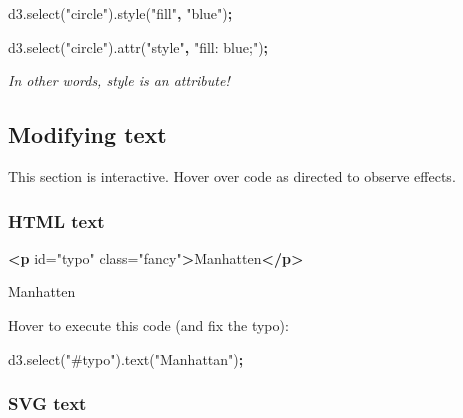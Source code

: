 \documentclass[openany]{book}
\newenvironment{Shaded}{\begin{snugshade}}{\end{snugshade}}
\newcommand{\AttributeTok}[1]{\textcolor[rgb]{0.77,0.63,0.00}{#1}}
\newcommand{\KeywordTok}[1]{\textcolor[rgb]{0.13,0.29,0.53}{\textbf{#1}}}
\newcommand{\NormalTok}[1]{#1}
\newcommand{\OperatorTok}[1]{\textcolor[rgb]{0.81,0.36,0.00}{\textbf{#1}}}
\newcommand{\OtherTok}[1]{\textcolor[rgb]{0.56,0.35,0.01}{#1}}
\newcommand{\StringTok}[1]{\textcolor[rgb]{0.31,0.60,0.02}{#1}}
\newcommand{\VariableTok}[1]{\textcolor[rgb]{0.00,0.00,0.00}{#1}}
\begin{document}
\begin{Shaded}
\begin{Highlighting}[]
\VariableTok{d3}\NormalTok{.}\AttributeTok{select}\NormalTok{(}\StringTok{"circle"}\NormalTok{).}\AttributeTok{style}\NormalTok{(}\StringTok{"fill"}\OperatorTok{,} \StringTok{"blue"}\NormalTok{)}\OperatorTok{;}

\VariableTok{d3}\NormalTok{.}\AttributeTok{select}\NormalTok{(}\StringTok{"circle"}\NormalTok{).}\AttributeTok{attr}\NormalTok{(}\StringTok{"style"}\OperatorTok{,} \StringTok{"fill: blue;"}\NormalTok{)}\OperatorTok{;}
\end{Highlighting}
\end{Shaded}

\emph{In other words, style is an attribute!}

\hypertarget{modifying-text}{%
\subsection{Modifying text}\label{modifying-text}}

This section is interactive. Hover over code as directed to observe effects.

\hypertarget{html-text}{%
\subsubsection*{HTML text}\label{html-text}}

\begin{Shaded}
\begin{Highlighting}[]
\KeywordTok{<p}\OtherTok{ id=}\StringTok{"typo"}\OtherTok{ class=}\StringTok{"fancy"}\KeywordTok{>}\NormalTok{Manhatten}\KeywordTok{</p>}
\end{Highlighting}
\end{Shaded}

Manhatten

Hover to execute this code (and fix the typo):

\hypertarget{fixtypo}{}
\begin{Shaded}
\begin{Highlighting}[]
\VariableTok{d3}\NormalTok{.}\AttributeTok{select}\NormalTok{(}\StringTok{"#typo"}\NormalTok{).}\AttributeTok{text}\NormalTok{(}\StringTok{"Manhattan"}\NormalTok{)}\OperatorTok{;}
\end{Highlighting}
\end{Shaded}

\hypertarget{svg-text}{%
\subsubsection*{SVG text}\label{svg-text}}
\end{document}

